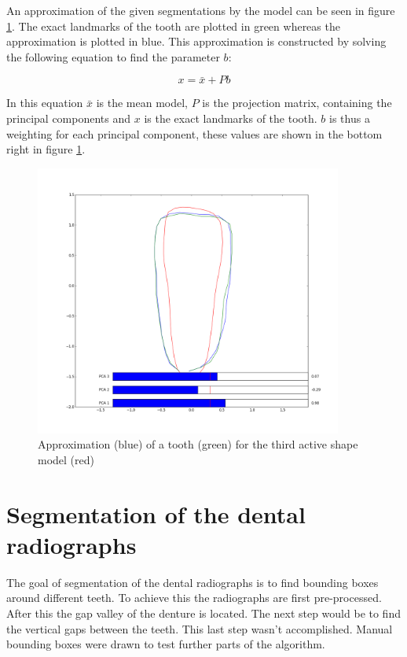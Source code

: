 \documentclass[a4paper,10pt]{article}
\begin{document}
An approximation of the given segmentations by the model can be seen in figure \ref{fig:pca_tooth}. The exact landmarks of the tooth are plotted in green whereas the approximation is plotted in blue. This approximation is constructed by solving the following equation to find the parameter $b$:

\begin{equation*}
	x = \bar{x} + Pb
\end{equation*}

In this equation $\bar{x}$ is the mean model, $P$ is the projection matrix, containing the principal components and $x$ is the exact landmarks of the tooth. $b$ is thus a weighting for each principal component, these values are shown in the bottom right in figure \ref{fig:pca_tooth}.


\begin{figure}[htbp]
	\centering
	\includegraphics[width=0.9\textwidth, trim=0cm 2.5cm 0cm 3cm, clip]{pca_tooth}
	\caption{Approximation (blue) of a tooth (green) for the third active shape model (red)}
	\label{fig:pca_tooth}
\end{figure}


\section{Segmentation of the dental radiographs}
The goal of segmentation of the dental radiographs is to find bounding boxes around different teeth. To achieve this the radiographs are first pre-processed. After this the gap valley of the denture is located. The next step would be to find the vertical gaps between the teeth. This last step wasn't accomplished. Manual bounding boxes were drawn to test further parts of the algorithm.
\end{document}

